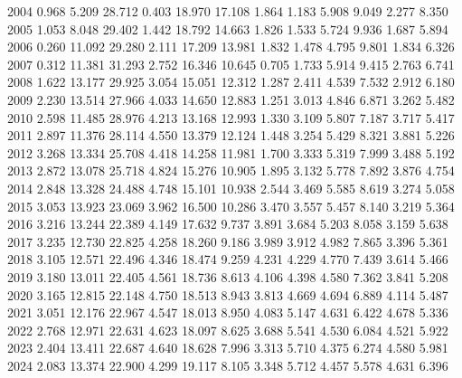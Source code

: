 {2004 0.968 5.209 28.712 0.403 18.970 17.108 1.864 1.183 5.908 9.049 2.277 8.350
2005 1.053 8.048 29.402 1.442 18.792 14.663 1.826 1.533 5.724 9.936 1.687 5.894
2006 0.260 11.092 29.280 2.111 17.209 13.981 1.832 1.478 4.795 9.801 1.834 6.326
2007 0.312 11.381 31.293 2.752 16.346 10.645 0.705 1.733 5.914 9.415 2.763 6.741
2008 1.622 13.177 29.925 3.054 15.051 12.312 1.287 2.411 4.539 7.532 2.912 6.180
2009 2.230 13.514 27.966 4.033 14.650 12.883 1.251 3.013 4.846 6.871 3.262 5.482
2010 2.598 11.485 28.976 4.213 13.168 12.993 1.330 3.109 5.807 7.187 3.717 5.417
2011 2.897 11.376 28.114 4.550 13.379 12.124 1.448 3.254 5.429 8.321 3.881 5.226
2012 3.268 13.334 25.708 4.418 14.258 11.981 1.700 3.333 5.319 7.999 3.488 5.192
2013 2.872 13.078 25.718 4.824 15.276 10.905 1.895 3.132 5.778 7.892 3.876 4.754
2014 2.848 13.328 24.488 4.748 15.101 10.938 2.544 3.469 5.585 8.619 3.274 5.058
2015 3.053 13.923 23.069 3.962 16.500 10.286 3.470 3.557 5.457 8.140 3.219 5.364
2016 3.216 13.244 22.389 4.149 17.632 9.737 3.891 3.684 5.203 8.058 3.159 5.638
2017 3.235 12.730 22.825 4.258 18.260 9.186 3.989 3.912 4.982 7.865 3.396 5.361
2018 3.105 12.571 22.496 4.346 18.474 9.259 4.231 4.229 4.770 7.439 3.614 5.466
2019 3.180 13.011 22.405 4.561 18.736 8.613 4.106 4.398 4.580 7.362 3.841 5.208
2020 3.165 12.815 22.148 4.750 18.513 8.943 3.813 4.669 4.694 6.889 4.114 5.487
2021 3.051 12.176 22.967 4.547 18.013 8.950 4.083 5.147 4.631 6.422 4.678 5.336
2022 2.768 12.971 22.631 4.623 18.097 8.625 3.688 5.541 4.530 6.084 4.521 5.922
2023 2.404 13.411 22.687 4.640 18.628 7.996 3.313 5.710 4.375 6.274 4.580 5.981
2024 2.083 13.374 22.900 4.299 19.117 8.105 3.348 5.712 4.457 5.578 4.631 6.396
}\allarchrolling

